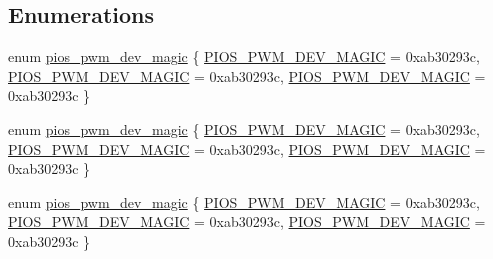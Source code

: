 \subsection*{\-Enumerations}
\begin{DoxyCompactItemize}
\item 
enum \hyperlink{group___p_i_o_s___p_w_m_ga42d376e6bd816a93a35efb03226d676e}{pios\-\_\-pwm\-\_\-dev\-\_\-magic} \{ \hyperlink{group___p_i_o_s___p_w_m_gga42d376e6bd816a93a35efb03226d676ea80a6eff8dafc5fcd440b4cb8282fc26e}{\-P\-I\-O\-S\-\_\-\-P\-W\-M\-\_\-\-D\-E\-V\-\_\-\-M\-A\-G\-I\-C} =  0xab30293c, 
\hyperlink{group___p_i_o_s___p_w_m_gga42d376e6bd816a93a35efb03226d676ea80a6eff8dafc5fcd440b4cb8282fc26e}{\-P\-I\-O\-S\-\_\-\-P\-W\-M\-\_\-\-D\-E\-V\-\_\-\-M\-A\-G\-I\-C} =  0xab30293c, 
\hyperlink{group___p_i_o_s___p_w_m_gga42d376e6bd816a93a35efb03226d676ea80a6eff8dafc5fcd440b4cb8282fc26e}{\-P\-I\-O\-S\-\_\-\-P\-W\-M\-\_\-\-D\-E\-V\-\_\-\-M\-A\-G\-I\-C} =  0xab30293c
 \}
\item 
enum \hyperlink{group___p_i_o_s___p_w_m_ga42d376e6bd816a93a35efb03226d676e}{pios\-\_\-pwm\-\_\-dev\-\_\-magic} \{ \hyperlink{group___p_i_o_s___p_w_m_gga42d376e6bd816a93a35efb03226d676ea80a6eff8dafc5fcd440b4cb8282fc26e}{\-P\-I\-O\-S\-\_\-\-P\-W\-M\-\_\-\-D\-E\-V\-\_\-\-M\-A\-G\-I\-C} =  0xab30293c, 
\hyperlink{group___p_i_o_s___p_w_m_gga42d376e6bd816a93a35efb03226d676ea80a6eff8dafc5fcd440b4cb8282fc26e}{\-P\-I\-O\-S\-\_\-\-P\-W\-M\-\_\-\-D\-E\-V\-\_\-\-M\-A\-G\-I\-C} =  0xab30293c, 
\hyperlink{group___p_i_o_s___p_w_m_gga42d376e6bd816a93a35efb03226d676ea80a6eff8dafc5fcd440b4cb8282fc26e}{\-P\-I\-O\-S\-\_\-\-P\-W\-M\-\_\-\-D\-E\-V\-\_\-\-M\-A\-G\-I\-C} =  0xab30293c
 \}
\item 
enum \hyperlink{group___p_i_o_s___p_w_m_ga42d376e6bd816a93a35efb03226d676e}{pios\-\_\-pwm\-\_\-dev\-\_\-magic} \{ \hyperlink{group___p_i_o_s___p_w_m_gga42d376e6bd816a93a35efb03226d676ea80a6eff8dafc5fcd440b4cb8282fc26e}{\-P\-I\-O\-S\-\_\-\-P\-W\-M\-\_\-\-D\-E\-V\-\_\-\-M\-A\-G\-I\-C} =  0xab30293c, 
\hyperlink{group___p_i_o_s___p_w_m_gga42d376e6bd816a93a35efb03226d676ea80a6eff8dafc5fcd440b4cb8282fc26e}{\-P\-I\-O\-S\-\_\-\-P\-W\-M\-\_\-\-D\-E\-V\-\_\-\-M\-A\-G\-I\-C} =  0xab30293c, 
\hyperlink{group___p_i_o_s___p_w_m_gga42d376e6bd816a93a35efb03226d676ea80a6eff8dafc5fcd440b4cb8282fc26e}{\-P\-I\-O\-S\-\_\-\-P\-W\-M\-\_\-\-D\-E\-V\-\_\-\-M\-A\-G\-I\-C} =  0xab30293c
 \}
\end{DoxyCompactItemize}
